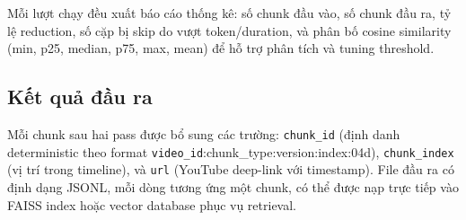 Mỗi lượt chạy đều xuất báo cáo thống kê: số chunk đầu vào, số chunk đầu ra, tỷ lệ reduction, số cặp bị skip do vượt token/duration, và phân bố cosine similarity (min, p25, median, p75, max, mean) để hỗ trợ phân tích và tuning threshold.

\subsection{Kết quả đầu ra}
Mỗi chunk sau hai pass được bổ sung các trường: \texttt{chunk\_id} (định danh deterministic theo format \texttt{{video\_id}}:{{chunk\_type}}:{{version}}:{{index:04d}}), \texttt{chunk\_index} (vị trí trong timeline), và \texttt{url} (YouTube deep-link với timestamp). File đầu ra có định dạng JSONL, mỗi dòng tương ứng một chunk, có thể được nạp trực tiếp vào FAISS index hoặc vector database phục vụ retrieval.